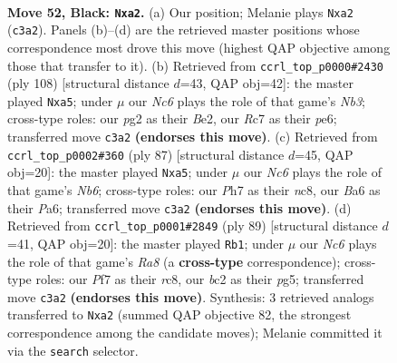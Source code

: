 \documentclass[11pt]{article}
\begin{document}
\clearpage

\begin{figure}[p]\centering
\begin{subfigure}{0.46\textwidth}\centering
\resizebox{\linewidth}{!}{%
\newchessgame
\chessboard[
  setfen={6k1/2r2p1p/b5p1/4Pp2/5P2/2n4N/P1B2KPP/8 b - - 13 52},
  showmover=false,
  pgfstyle=straightmove, color=movearrow, markmove={c3-a2}
]}
\caption{}
\end{subfigure}\hfill
\begin{subfigure}{0.46\textwidth}\centering
\resizebox{\linewidth}{!}{%
\newchessgame
\chessboard[
  setfen={6k1/1b3pp1/4p2p/pPp5/n1P5/1N3P1P/4B1P1/6K1 w - - 0 55},
  showmover=false,
  pgfstyle=straightmove, color=movearrow, markmove={b3-a5}
]}
\caption{}
\end{subfigure}
\\[4pt]
\begin{subfigure}{0.46\textwidth}\centering
\resizebox{\linewidth}{!}{%
\newchessgame
\chessboard[
  setfen={2N5/1r3pk1/p5p1/P2P3p/2R4P/1n3P2/6P1/6K1 b - - 0 44},
  showmover=false,
  pgfstyle=straightmove, color=movearrow, markmove={b3-a5}
]}
\caption{}
\end{subfigure}\hfill
\begin{subfigure}{0.46\textwidth}\centering
\resizebox{\linewidth}{!}{%
\newchessgame
\chessboard[
  setfen={2R5/4ppkp/6p1/1N4P1/p4P2/P4K2/4P2P/r2n4 b - - 16 45},
  showmover=false,
  pgfstyle=straightmove, color=movearrow, markmove={a1-b1}
]}
\caption{}
\end{subfigure}
\caption{\textbf{Move 52, Black: \texttt{Nxa2}.} (a) Our position; Melanie plays \texttt{Nxa2} (\texttt{c3a2}). Panels (b)--(d) are the retrieved master positions whose correspondence most drove this move (highest QAP objective among those that transfer to it). (b) Retrieved from \texttt{ccrl\_top\_p0000\#2430} (ply 108) [structural distance $d$=43, QAP obj=42]: the master played \texttt{Nxa5}; under $\mu$ our \emph{Nc6} plays the role of that game's \emph{Nb3}; cross-type roles: our \emph{p}g2 as their \emph{B}e2, our \emph{R}c7 as their \emph{p}e6; transferred move \texttt{c3a2} \textbf{(endorses this move)}. (c) Retrieved from \texttt{ccrl\_top\_p0002\#360} (ply 87) [structural distance $d$=45, QAP obj=20]: the master played \texttt{Nxa5}; under $\mu$ our \emph{Nc6} plays the role of that game's \emph{Nb6}; cross-type roles: our \emph{P}h7 as their \emph{n}c8, our \emph{B}a6 as their \emph{P}a6; transferred move \texttt{c3a2} \textbf{(endorses this move)}. (d) Retrieved from \texttt{ccrl\_top\_p0001\#2849} (ply 89) [structural distance $d$=41, QAP obj=20]: the master played \texttt{Rb1}; under $\mu$ our \emph{Nc6} plays the role of that game's \emph{Ra8} (a \textbf{cross-type} correspondence); cross-type roles: our \emph{P}f7 as their \emph{r}c8, our \emph{b}c2 as their \emph{p}g5; transferred move \texttt{c3a2} \textbf{(endorses this move)}. Synthesis: 3 retrieved analogs transferred to \texttt{Nxa2} (summed QAP objective 82, the strongest correspondence among the candidate moves); Melanie committed it via the \texttt{search} selector.}
\label{fig:thought-m103}
\end{figure}
\end{document}
